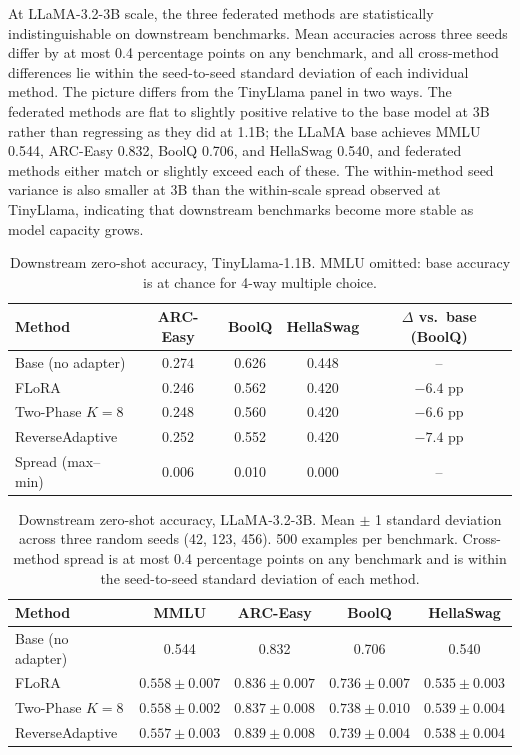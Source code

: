 At LLaMA-3.2-3B scale, the three federated methods are statistically indistinguishable on downstream benchmarks. Mean accuracies across three seeds differ by at most 0.4 percentage points on any benchmark, and all cross-method differences lie within the seed-to-seed standard deviation of each individual method. The picture differs from the TinyLlama panel in two ways. The federated methods are flat to slightly positive relative to the base model at 3B rather than regressing as they did at 1.1B; the LLaMA base achieves MMLU 0.544, ARC-Easy 0.832, BoolQ 0.706, and HellaSwag 0.540, and federated methods either match or slightly exceed each of these. The within-method seed variance is also smaller at 3B than the within-scale spread observed at TinyLlama, indicating that downstream benchmarks become more stable as model capacity grows.

\begin{table}[t]
\caption{Downstream zero-shot accuracy, TinyLlama-1.1B. MMLU omitted: base accuracy is at chance for 4-way multiple choice.}
\label{tab:downstream_tiny}
\begin{center}
\begin{tabular}{lcccc}
\toprule
Method & ARC-Easy & BoolQ & HellaSwag & $\Delta$ vs.\ base (BoolQ) \\
\midrule
Base (no adapter) & 0.274 & 0.626 & 0.448 & -- \\
FLoRA             & 0.246 & 0.562 & 0.420 & $-6.4$ pp \\
Two-Phase $K{=}8$ & 0.248 & 0.560 & 0.420 & $-6.6$ pp \\
ReverseAdaptive   & 0.252 & 0.552 & 0.420 & $-7.4$ pp \\
Spread (max--min) & 0.006 & 0.010 & 0.000 & -- \\
\bottomrule
\end{tabular}
\end{center}
\end{table}

\begin{table}[t]
\caption{Downstream zero-shot accuracy, LLaMA-3.2-3B. Mean $\pm$ 1 standard deviation across three random seeds (42, 123, 456). 500 examples per benchmark. Cross-method spread is at most 0.4 percentage points on any benchmark and is within the seed-to-seed standard deviation of each method.}
\label{tab:downstream_llama}
\begin{center}
\begin{tabular}{lcccc}
\toprule
Method & MMLU & ARC-Easy & BoolQ & HellaSwag \\
\midrule
Base (no adapter) & 0.544 & 0.832 & 0.706 & 0.540 \\
FLoRA             & $0.558 \pm 0.007$ & $0.836 \pm 0.007$ & $0.736 \pm 0.007$ & $0.535 \pm 0.003$ \\
Two-Phase $K{=}8$ & $0.558 \pm 0.002$ & $0.837 \pm 0.008$ & $0.738 \pm 0.010$ & $0.539 \pm 0.004$ \\
ReverseAdaptive   & $0.557 \pm 0.003$ & $0.839 \pm 0.008$ & $0.739 \pm 0.004$ & $0.538 \pm 0.004$ \\
\bottomrule
\end{tabular}
\end{center}
\end{table}

